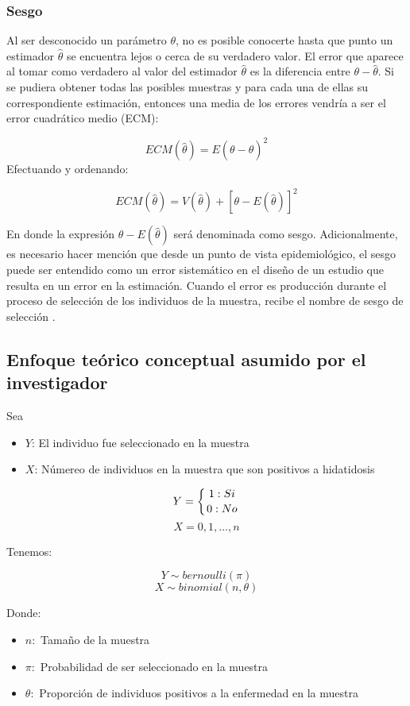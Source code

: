 \subsubsection{Sesgo}
Al ser desconocido un parámetro $\theta$, no es posible conocerte hasta que punto un estimador $\hat{\theta}$ se encuentra lejos o cerca de su verdadero valor. El error que aparece al tomar como verdadero al valor del estimador $\hat{\theta}$ es la diferencia entre $\theta - \hat{\theta}$. Si se pudiera obtener todas las posibles muestras y para cada una de ellas su correspondiente estimación, entonces una media de los errores vendría a ser el error cuadrático medio (ECM):

$$ECM (\hat{\theta}) = E (\theta - \hat{\theta})^2$$
Efectuando y ordenando:

$$ECM (\hat{\theta}) = V( \hat{\theta} ) + [\theta - E (\hat{\theta})]^2$$

En donde la expresión $\theta - E (\hat{\theta})$ será denominada como sesgo\cite{ruiz2004fundamentos}. Adicionalmente, es necesario hacer mención que desde un punto de vista epidemiológico, el sesgo puede ser entendido como un error sistemático en el diseño de un estudio que resulta en un error en la estimación. Cuando el error es producción durante el proceso de selección de los individuos de la muestra, recibe el nombre de sesgo de selección \cite{celentano2019gordis}.


\subsection{Enfoque teórico conceptual asumido por el investigador}
Sea 
\begin{itemize}
    \item[] $Y$: El individuo fue seleccionado en la muestra
    \item[] $X$: Númereo de individuos en la muestra que son positivos a hidatidosis
\end{itemize}
$$Y = \left\{
1: Si\atop
0:No
\right.$$
$$X = 0, 1, \ldots, n$$

Tenemos:

$$Y \sim bernoulli(\pi)$$
$$X \sim binomial(n,\theta)$$

Donde:

\begin{itemize}
    \item[] $n:$ Tamaño de la muestra
    \item[] $\pi:$ Probabilidad de ser seleccionado en la muestra
    \item[] $\theta:$ Proporción de individuos positivos a la enfermedad en la muestra
\end{itemize}

